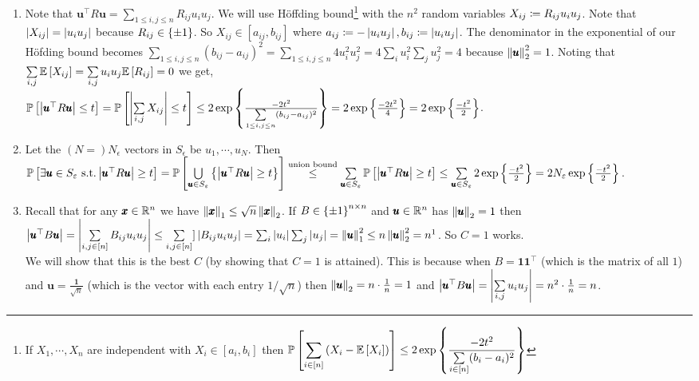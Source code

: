 \begin{enumerate}[leftmargin=*, label=(\alph*)]
\item Note that $\pmb u^{\top}R\pmb u = \sum\limits_{1\le i,j\le n}R_{ij}u_{i}u_{j}$. We will use H\"offding bound\footnote{If $X_{1},\cdots,X_{n}$ are independent with $X_{i}\in [a_{i},b_{i}]$ then $\displaystyle\mathbb P\left[ \sum_{i\in [n]}\left(X_{i}-\mathbb E\left[ X_{i} \right]\right) \right]\le 2\exp\left\{\frac{-2t^{2}}{\sum\limits_{i\in[n]}(b_{i}-a_{i})^{2}}\right\}$} with the $n^{2}$ random variables $X_{ij} \coloneqq R_{ij}u_{i}u_{j}$. Note that $\left| X_{ij} \right| = \left| u_{i}u_{j} \right|$ because $R_{ij}\in \left\{\pm 1\right\}$. So $X_{ij}\in [a_{ij},b_{ij}]$ where $a_{ij}\coloneqq -\left| u_{i}u_{j} \right|, b_{ij}\coloneqq \left| u_{i}u_{j} \right|$. The denominator in the exponential of our H\"ofding bound becomes $\sum\limits_{1\le i,j\le n}(b_{ij}-a_{ij})^{2} = \sum\limits_{1\le i,j\le n}4u_{i}^{2}u_{j}^{2} = 4\sum_{i}u_{i}^{2}\sum_{j}u_{j}^{2} = 4$ because $\left\lVert \pmb u \right\rVert_{2}^{2}=1$. Noting that $\sum\limits_{i,j}\mathbb E\left[ X_{ij} \right] = \sum\limits_{i,j}u_{i}u_{j}\mathbb E\left[ R_{ij} \right] = 0$ we get,\\
$\mathbb P\left[ \left| \pmb u^{\top}R\pmb u \right| \le t \right] = \mathbb P\left[ \left| \sum\limits_{i,j}X_{ij} \right|\le t \right]
\le 2\exp\left\{\frac{-2t^{2}}{\sum\limits_{1\le i,j\le n}(b_{ij}-a_{ij})^{2}}\right\}
= 2\exp\left\{\frac{-2t^{2}}{4}\right\} = 2\exp\left\{\frac{-t^{2}}{2}\right\}$.
\item Let the $(N=)N_{\epsilon}$ vectors in $S_{\epsilon}$ be $u_{1},\cdots, u_{N}$. Then $\mathbb P\left[ \exists \pmb u\in S_{\varepsilon} \text{ s.t.} \left| \pmb u^{\top}R\pmb u \right|\ge t \right]  =\\ \mathbb P\left[ \bigcup\limits_{\pmb u\in S_{\varepsilon}} \left\{\left| \pmb u^{\top}R\pmb u \right|\ge t\right\} \right]  \stackrel{\text{union bound}}{\le} \sum\limits_{\pmb u\in S_{\varepsilon}}\mathbb P\left[ \left| \pmb u^{\top}R\pmb u \right|\ge t \right] \le \sum\limits_{\pmb u\in S_{\varepsilon}}2\exp\left\{\frac{-t^{2}}{2}\right\} = 2N_{\varepsilon}\exp\left\{\frac{-t^{2}}{2}\right\}$.
\item Recall that for any $\pmb x\in\mathbb{R}^{n}$ we have $\left\lVert \pmb x \right\rVert_{1} \le \sqrt n\left\lVert \pmb x \right\rVert_{2}$. If $B\in \left\{\pm1\right\}^{n\times n}$ and $\pmb u\in\mathbb{R}^{n}$ has $\left\lVert \pmb u \right\rVert_{2}=1$ then $\left| \pmb u^{\top}B\pmb u \right| = \left| \sum\limits_{i,j\in[n]}B_{ij}u_{i}u_{j} \right|\le \sum\limits_{i,j\in[n]}]\left| B_{ij}u_{i}u_{j} \right| = \sum_{i}\left| u_{i} \right|\sum_{j}\left| u_{j} \right| = \left\lVert \pmb u \right\rVert_{1}^{2} \le n\left\lVert \pmb u \right\rVert_{2}^{2} = n^{1}$. So $C=1$ works.\\
We will show that this is the best $C$ (by showing that $C=1$ is attained). This is because when $B=\pmb 1\pmb 1^{\top}$  (which is the matrix of all $1$) and $\pmb u = \frac{\pmb 1}{\sqrt n}$ (which is the vector with each entry $1/\sqrt n$) then $\left\lVert \pmb u \right\rVert_{2} = n\cdot\frac1n = 1$ and $\left| \pmb u^{\top}B\pmb u \right| = \left| \sum\limits_{i,j}u_{i}u_{j} \right| = n^{2}\cdot\frac{1}{n} = n$.

\end{enumerate}

